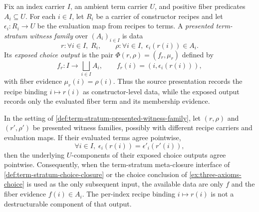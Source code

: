 \begin{definition}
\label{def:term-stratum-presented-witness-family}
Fix an index carrier $I$, an ambient term carrier $U$, and positive fiber predicates $A_i \subseteq U$. For each $i\in I$, let $R_i$ be a carrier of constructor recipes and let $\epsilon_i:R_i\to U$ be the evaluation map from recipes to terms. A \emph{presented term-stratum witness family} over $(A_i)_{i\in I}$ is data
$$
r:\forall i\in I,\;R_i,
\qquad
\rho:\forall i\in I,\;\epsilon_i(r(i))\in A_i.
$$
Its \emph{exposed choice output} is the pair $\Phi(r,\rho)=(f_r,\mu_r)$ defined by
$$
f_r:I\to\bigsqcup_{i\in I}A_i,
\qquad
f_r(i)=(i,\epsilon_i(r(i))),
$$
with fiber evidence $\mu_r(i)=\rho(i)$. Thus the source presentation records the recipe binding $i\mapsto r(i)$ as constructor-level data, while the exposed output records only the evaluated fiber term and its membership evidence.
\end{definition}

\begin{proposition}
\label{prop:term-stratum-meta-closure-drops-witness-family}
In the setting of \autoref{def:term-stratum-presented-witness-family}, let $(r,\rho)$ and $(r',\rho')$ be presented witness families, possibly with different recipe carriers and evaluation maps. If their evaluated terms agree pointwise,
$$
\forall i\in I,\;\epsilon_i(r(i))=\epsilon'_i(r'(i)),
$$
then the underlying $U$-components of their exposed choice outputs agree pointwise. Consequently, when the term-stratum meta-closure interface of \autoref{def:term-stratum-choice-closure} or the choice conclusion of \autoref{ex:three-axioms-choice} is used as the only subsequent input, the available data are only $f$ and the fiber evidence $f(i)\in A_i$. The per-index recipe binding $i\mapsto r(i)$ is not a destructurable component of that output.
\end{proposition}

